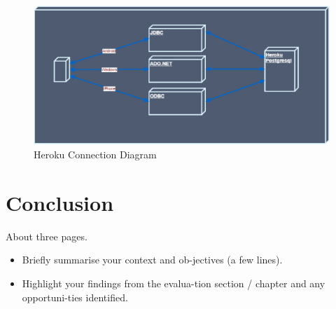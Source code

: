 \begin{figure}
	\includegraphics{img/connection-diagram.png}
	\caption{Heroku Connection Diagram}
\end{figure}
\chapter{Conclusion}
About three pages.

\begin{itemize}
\item Briefly summarise your context and ob-jectives (a few lines).
\item Highlight your findings from the evalua-tion section / chapter and any opportuni-ties identified.
\end{itemize}

